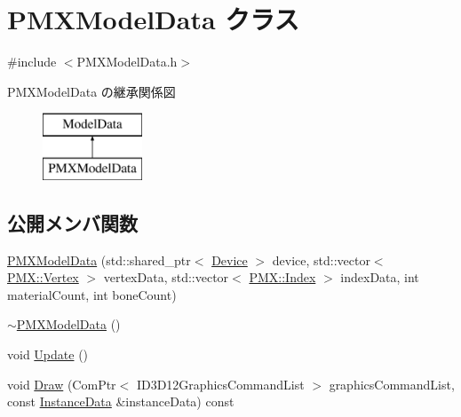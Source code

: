 \hypertarget{class_p_m_x_model_data}{}\section{P\+M\+X\+Model\+Data クラス}
\label{class_p_m_x_model_data}


{\ttfamily \#include $<$P\+M\+X\+Model\+Data.\+h$>$}

P\+M\+X\+Model\+Data の継承関係図\begin{figure}[H]
\begin{center}
\leavevmode
\includegraphics[height=2.000000cm]{class_p_m_x_model_data}
\end{center}
\end{figure}
\subsection*{公開メンバ関数}
\begin{DoxyCompactItemize}
\item 
\mbox{\hyperlink{class_p_m_x_model_data_a9865c076685f2efab59e2f19b12e86b5}{P\+M\+X\+Model\+Data}} (std\+::shared\+\_\+ptr$<$ \mbox{\hyperlink{class_device}{Device}} $>$ device, std\+::vector$<$ \mbox{\hyperlink{struct_p_m_x_1_1_vertex}{P\+M\+X\+::\+Vertex}} $>$ vertex\+Data, std\+::vector$<$ \mbox{\hyperlink{struct_p_m_x_1_1_index}{P\+M\+X\+::\+Index}} $>$ index\+Data, int material\+Count, int bone\+Count)
\item 
\mbox{\hyperlink{class_p_m_x_model_data_aab20c1e8dd3219cd165f877508e256a6}{$\sim$\+P\+M\+X\+Model\+Data}} ()
\item 
void \mbox{\hyperlink{class_p_m_x_model_data_a4c692007e0b890ee0bfd0f2bbbe0b97f}{Update}} ()
\item 
void \mbox{\hyperlink{class_p_m_x_model_data_aa88713736e3c337cabb23127c03be3c2}{Draw}} (Com\+Ptr$<$ I\+D3\+D12\+Graphics\+Command\+List $>$ graphics\+Command\+List, const \mbox{\hyperlink{struct_instance_data}{Instance\+Data}} \&instance\+Data) const
\end{DoxyCompactItemize}
